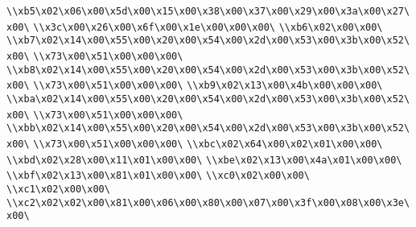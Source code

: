 \verb|\\xb5\x02\x06\x00\x5d\x00\x15\x00\x38\x00\x37\x00\x29\x00\x3a\x00\x27\x00\|\newline
\verb|\\x3c\x00\x26\x00\x6f\x00\x1e\x00\x00\x00\|\newline
\verb|\\xb6\x02\x00\x00\|\newline
\verb|\\xb7\x02\x14\x00\x55\x00\x20\x00\x54\x00\x2d\x00\x53\x00\x3b\x00\x52\x00\|\newline
\verb|\\x73\x00\x51\x00\x00\x00\|\newline
\verb|\\xb8\x02\x14\x00\x55\x00\x20\x00\x54\x00\x2d\x00\x53\x00\x3b\x00\x52\x00\|\newline
\verb|\\x73\x00\x51\x00\x00\x00\|\newline
\verb|\\xb9\x02\x13\x00\x4b\x00\x00\x00\|\newline
\verb|\\xba\x02\x14\x00\x55\x00\x20\x00\x54\x00\x2d\x00\x53\x00\x3b\x00\x52\x00\|\newline
\verb|\\x73\x00\x51\x00\x00\x00\|\newline
\verb|\\xbb\x02\x14\x00\x55\x00\x20\x00\x54\x00\x2d\x00\x53\x00\x3b\x00\x52\x00\|\newline
\verb|\\x73\x00\x51\x00\x00\x00\|\newline
\verb|\\xbc\x02\x64\x00\x02\x01\x00\x00\|\newline
\verb|\\xbd\x02\x28\x00\x11\x01\x00\x00\|\newline
\verb|\\xbe\x02\x13\x00\x4a\x01\x00\x00\|\newline
\verb|\\xbf\x02\x13\x00\x81\x01\x00\x00\|\newline
\verb|\\xc0\x02\x00\x00\|\newline
\verb|\\xc1\x02\x00\x00\|\newline
\verb|\\xc2\x02\x02\x00\x81\x00\x06\x00\x80\x00\x07\x00\x3f\x00\x08\x00\x3e\x00\|\newline
